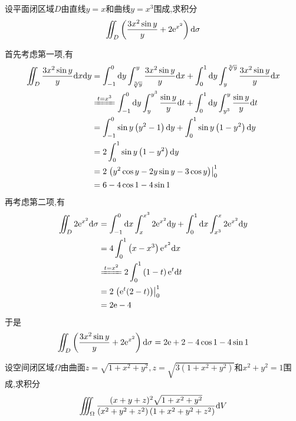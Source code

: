 \documentclass{ctexart}
\begin{document}
\begin{problem}[7.(10\songti{分})]
    设平面闭区域$D$由直线$y=x$和曲线$y=x^3$围成,求积分
    \[\iint_D\left(\dfrac{3x^2\sin y}{y}+2\mathrm{e}^{x^2}\right)\mathrm{d}\sigma\]

\end{problem}
\begin{solution}
    首先考虑第一项,有
    \[\begin{aligned}
        \iint_D\dfrac{3x^2\sin y}{y}\di x\di y
        &= \int_{-1}^0\di y\int_{\sqrt[3]y}^{y}\dfrac{3x^2\sin y}{y}\di x+\int_{0}^1\di y\int_{y}^{\sqrt[3]y}\dfrac{3x^2\sin y}{y}\di x \\
        &\xlongequal{t=x^3} \int_{-1}^0\di y\int_y^{y^3}\dfrac{\sin y}{y}\di t+\int_{0}^1\di y\int_{y^3}^{y}\dfrac{\sin y}{y}\di t\\
        &= \int_{-1}^0\sin y\left(y^2-1\right)\di y+\int_{0}^1\sin y\left(1-y^2\right)\di y\\
        &= 2\int_{0}^1\sin y\left(1-y^2\right)\di y \\
        &= 2\left.\left(y^2\cos y-2y\sin y-3\cos y\right)\right|_0^1 \\
        &= 6-4\cos 1-4\sin 1
    \end{aligned}\]
    再考虑第二项,有
    \[\begin{aligned}
        \iint_D2\e^{x^2}\di\sigma
        &= \int_{-1}^0\dx\int_{x}^{x^3}2\e^{x^2}\di y+\int_{0}^1\dx\int_{x^3}^{x}2\e^{x^2}\di y \\
        &= 4\int_{0}^1\left(x-x^3\right)\e^{x^2}\dx \\
        &\xlongequal{t=x^2}2\int_0^1\left(1-t\right)\e^t\di t \\
        &= 2\left.\left(\e^t(2-t)\right)\right|_0^1 \\
        &= 2\e-4
    \end{aligned}\]
    于是
    \[\iint_D\left(\dfrac{3x^2\sin y}{y}+2\mathrm{e}^{x^2}\right)\mathrm{d}\sigma=2\mathrm{e}+2-4\cos 1-4\sin 1\]

\end{solution}
\begin{problem}[8.(10\songti{分})]
    设空间闭区域$\Omega$由曲面$z=\sqrt{1+x^2+y^2},z=\sqrt{3\left(1+x^2+y^2\right)}$和$x^2+y^2=1$围成,求积分
    \[\iiint_{\Omega}\dfrac{(x+y+z)^2\sqrt{1+x^2+y^2}}{\left(x^2+y^2+z^2\right)\left(1+x^2+y^2+z^2\right)}\mathrm{d} V\]

\end{problem}
\end{document}
